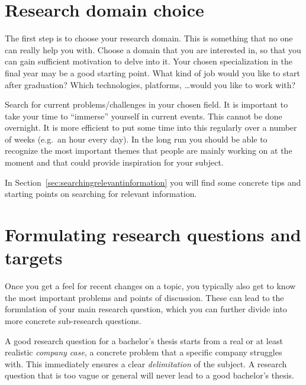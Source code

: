 \section{Research domain choice}
\label{sec:research}

The first step is to choose your research domain. This is something that no one can really help you with. Choose a domain that you are interested in, so that you can gain sufficient motivation to delve into it. Your chosen specialization in the final year may be a good starting point. What kind of job would you like to start after graduation? Which technologies, platforms, \ldots would you like to work with?

Search for current problems/challenges in your chosen field. It is important to take your time to ``immerse'' yourself in current events. This cannot be done overnight. It is more efficient to put some time into this regularly over a number of weeks (e.g.\ an hour every day). In the long run you should be able to recognize the most important themes that people are mainly working on at the moment and that could provide inspiration for your subject.

In Section~\ref{sec:searchingrelevantinformation} you will find some concrete tips and starting points on searching for relevant information. 

\section{Formulating research questions and targets}
\label{sec:formulatingresearchquestion}

Once you get a feel for recent changes on a topic, you typically also get to know the most important problems and points of discussion. These can lead to the formulation of your main research question, which you can further divide into more concrete sub-research questions.

A good research question for a bachelor's thesis starts from a real or at least realistic \textit{company case}, a concrete problem that a specific company struggles with. This immediately ensures a clear \textit{delimitation} of the subject. A research question that is too vague or general will never lead to a good bachelor's thesis.

